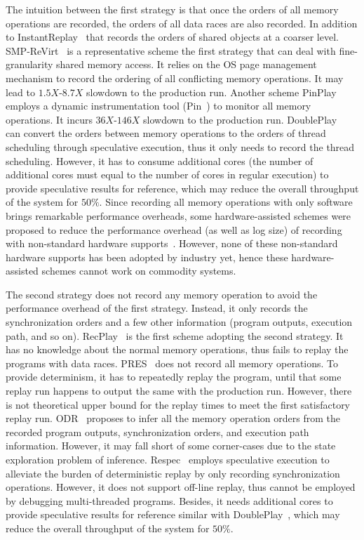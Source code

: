 \documentclass[10pt,onecolumn,letterpaper]{article}
\begin{document}
The intuition between the first strategy is that once the orders of
all memory operations are recorded, the orders of all data races are
also recorded. In addition to InstantReplay~\cite{LeBlanc87TC} that
records the orders of shared objects at a coarser level.
SMP-ReVirt~\cite{Dunlap08VEE} is a representative scheme the first
strategy that can deal with fine-granularity shared memory access.
It relies on the OS page management mechanism to record the ordering
of all conflicting memory operations. It may lead to $1.5X$-$8.7X$
slowdown to the production run. Another scheme
PinPlay~\cite{Patil10CGO} employs a dynamic instrumentation tool
(Pin~\cite{Luk05PLDI}) to monitor all memory operations. It incurs
$36X$-$146X$ slowdown to the production run.
DoublePlay~\cite{Veeraraghavan11ASPLOS} can convert the orders
between memory operations to the orders of thread scheduling through
speculative execution, thus it only needs to record the thread
scheduling. However, it has to consume additional cores (the number
of additional cores must equal to the number of cores in regular
execution) to provide speculative results for reference, which may
reduce the overall throughput of the system for $50\%$. Since
recording all memory operations with only software brings remarkable
performance overheads, some hardware-assisted schemes were proposed
to reduce the performance overhead (as well as log size) of
recording with non-standard hardware
supports~\cite{Xu03ISCA,Hower08ISCA,Montesinos08ISCA,Voskuilen10ISCA}.
However, none of these non-standard hardware supports has been
adopted by industry yet, hence these hardware-assisted schemes
cannot work on commodity systems.


The second strategy does not record any memory operation to avoid
the performance overhead of the first strategy. Instead, it only
records the synchronization orders and a few other information
(program outputs, execution path, and so on).
RecPlay~\cite{Ronsse99TCS} is the first scheme adopting the second
strategy. It has no knowledge about the normal memory operations,
thus fails to replay the programs with data races.
PRES~\cite{Park09SOSP} does not record all memory operations. To
provide determinism, it has to repeatedly replay the program, until
that some replay run happens to output the same with the production
run. However, there is not theoretical upper bound for the replay
times to meet the first satisfactory replay run.
ODR~\cite{Altekar09SOSP} proposes to infer all the memory operation
orders from the recorded program outputs, synchronization orders,
and execution path information. However, it may fall short of some
corner-cases due to the state exploration problem of inference.
Respec~\cite{Lee10ASPLOS} employs speculative execution to alleviate
the burden of deterministic replay by only recording synchronization
operations. However, it does not support off-line replay, thus
cannot be employed by debugging multi-threaded programs. Besides, it
needs additional cores to provide speculative results for reference
similar with DoublePlay~\cite{Veeraraghavan11ASPLOS}, which may
reduce the overall throughput of the system for $50\%$.
\end{document}
